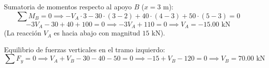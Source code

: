 Sumatoria de momentos respecto al apoyo $B$ ($x = 3\text{ m}$):
\begin{equation}
    \sum M_B = 0 \implies -V_A \cdot 3 - 30 \cdot (3 - 2) + 40 \cdot (4 - 3) + 50 \cdot (5 - 3) = 0
\end{equation}
\begin{equation}
    -3 V_A - 30 + 40 + 100 = 0 \implies -3 V_A + 110 = 0 \implies V_A = -15.00\text{ kN}
\end{equation}
(La reacción $V_A$ es hacia abajo con magnitud $15\text{ kN}$).

Equilibrio de fuerzas verticales en el tramo izquierdo:
\begin{equation}
    \sum F_y = 0 \implies V_A + V_B - 30 - 40 - 50 = 0 \implies -15 + V_B - 120 = 0 \implies \boxed{V_B = 70.00\text{ kN}}
\end{equation}


